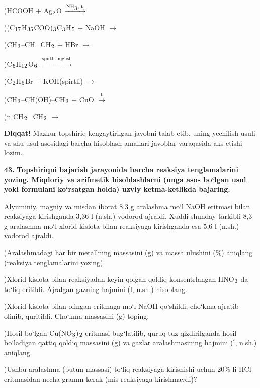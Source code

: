 \documentclass[11pt,a4paper]{article}
\renewcommand{\textsubscript}[1]{\ensuremath{_{\text{\fontsize{8}{8}\selectfont #1}}}}
\newcommand{\diqqat}[1]{\par\smallskip\noindent\textbf{Diqqat!} #1\par\medskip}
\begin{document}
)HCOOH + Ag\textsubscript{2}O $\xrightarrow{\text{NH\textsubscript{3}, t}}$\par
{})(C\textsubscript{17}H\textsubscript{35}COO)\textsubscript{3}C\textsubscript{3}H\textsubscript{5} + NaOH $\to$\par
{})CH\textsubscript{3}--CH=CH\textsubscript{2} + HBr $\to$\par
{})C\textsubscript{6}H\textsubscript{12}O\textsubscript{6} $\xrightarrow{\text{spirtli bijg`ish}}$\par
{})C\textsubscript{2}H\textsubscript{5}Br + KOH(spirtli) $\to$\par
{})CH\textsubscript{3}--CH(OH)--CH\textsubscript{3} + CuO $\xrightarrow{\text{t}}$\par
{})n CH\textsubscript{2}=CH\textsubscript{2} $\to$\par
\diqqat{Mazkur topshiriq kengaytirilgan javobni talab etib, uning yechilish usuli va shu usul asosidagi barcha hisoblash amallari javoblar varaqasida aks etishi lozim.}
\noindent\textbf{43.} \textbf{Topshiriqni bajarish jarayonida barcha reaksiya tenglamalarini yozing. Miqdoriy va arifmetik hisoblashlarni (unga asos bo`lgan usul yoki formulani ko`rsatgan holda) uzviy ketma-ketlikda bajaring.}\par\smallskip
Alyuminiy, magniy va misdan iborat 8,3 g aralashma mo`l NaOH eritmasi bilan reaksiyaga kirishganda 3,36 l (n.sh.) vodorod ajraldi. Xuddi shunday tarkibli 8,3 g aralashma mo`l xlorid kislota bilan reaksiyaga kirishganda esa 5,6 l (n.sh.) vodorod ajraldi.\par
{})Aralashmadagi har bir metallning massasini (g) va massa ulushini (\%) aniqlang (reaksiya tenglamalarini yozing).\par
{})Xlorid kislota bilan reaksiyadan keyin qolgan qoldiq konsentrlangan HNO\textsubscript{3} da to`liq eritildi. Ajralgan gazning hajmini (l, n.sh.) hisoblang.\par
{})Xlorid kislota bilan olingan eritmaga mo`l NaOH qo`shildi, cho`kma ajratib olinib, quritildi. Cho`kma massasini (g) toping.\par
{})Hosil bo`lgan Cu(NO\textsubscript{3})\textsubscript{2} eritmasi bug`latilib, quruq tuz qizdirilganda hosil bo`ladigan qattiq qoldiq massasini (g) va gazlar aralashmasining hajmini (l, n.sh.) aniqlang.\par
{})Ushbu aralashma (butun massasi) to`liq reaksiyaga kirishishi uchun 20\% li HCl eritmasidan necha gramm kerak (mis reaksiyaga kirishmaydi)?\par
\end{document}
